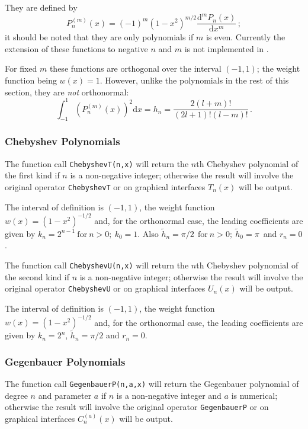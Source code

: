 They are defined by
\[P_n^{(m)}(x) = (-1)^m(1-x^2)^{m/2}\frac{\mathrm{d}^m P_n(x)}{\mathrm{d}x^m}\,;\]
it should be noted that they are only polynomials if $m$ is even. Currently
the extension of these functions to negative $n$ and $m$ is not implemented
in \REDUCE.

For fixed $m$ these functions are orthogonal over the interval $(-1, 1)$;
the weight function being $w(x)=1$. However, unlike the polynomials in the rest
of this section, they are \emph{not} orthonormal:
\[\int_{-1}^1 \left(P_n^{(m)}(x)\right)^2 \mathrm{d}x = h_n =
\frac{2(l+m)!}{(2l+1)!(l-m)!}\,.\]

\subsubsection{Chebyshev Polynomials}
\hypertarget{CHEBYSHEVP}{}
 
The function call \texttt{ChebyshevT(n,x)} will return the $n$th Chebyshev
polynomial of the first kind if $n$ is a non-negative integer; otherwise the
result will involve the original operator \texttt{ChebyshevT} or on graphical
interfaces $T_n(x)$ will be output.

The interval of definition is $(-1, 1)$, the weight function
$w(x)=(1-x^2)^{-1/2}$ and, for the orthonormal case, the leading
coefficients are given by $k_n= 2^{n-1}\ \mbox{for}\ n>0;\ k_0 =1$. Also
$\tilde{h}_n = \pi/2\ \ \mbox{for}\ n>0;\ \tilde{h}_0 =\pi\,$ and $r_n=0$.

The function call \texttt{ChebyshevU(n,x)} will return the $n$th Chebyshev
polynomial of the second kind if $n$ is a non-negative integer; otherwise the
result will involve the original operator \texttt{ChebyshevU} or on graphical
interfaces $U_n(x)$ will be output.

The interval of definition is $(-1, 1)$, the weight function
$w(x)=(1-x^2)^{-1/2}$ and, for the orthonormal case, the leading
coefficients are given by $k_n= 2^n$, $\tilde{h}_n = \pi/2$ and $r_n=0$.

\subsubsection{Gegenbauer Polynomials}
\hypertarget{GEGENBAUERP}{}
 
The function call \texttt{GegenbauerP(n,a,x)} will return the Gegenbauer
polynomial of degree $n$ and parameter $a$ if $n$ is a non-negative integer
and $a$ is numerical; otherwise the result will involve the original operator
\texttt{GegenbauerP} or on graphical interfaces $C_n^{(a)}(x)$ will be output.

